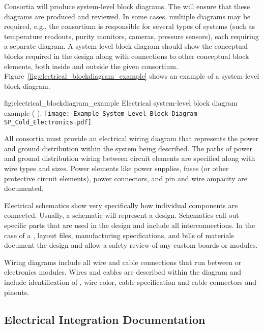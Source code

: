 Consortia will produce system-level block diagrams. The 
will ensure that these diagrams are produced and reviewed.  In
some cases, multiple %
diagrams may be required, e.g., the %
 consortium %
is responsible for several types of
systems (such as temperature readouts, purity monitors, cameras,
pressure sensors), each requiring a separate %
diagram. A system-level block diagram should show the conceptual
blocks required in the design along with connections to other
conceptual block elements, both inside and outside the given consortium.
Figure~\ref{fig:electrical_blockdiagram_example} shows an example of a
system-level block diagram.
\begin{dunefigure}{fig:electrical_blockdiagram_example}
  {Electrical system-level block diagram example ( ).}
 \texttt{[image: Example\_System\_Level\_Block-Diagram-SP\_Cold\_Electronics.pdf]}
\end{dunefigure}


All consortia must provide an electrical wiring diagram that 
represents the power and ground distribution within the system being
described.  The paths of power and ground distribution wiring between
circuit elements are specified along with wire types and sizes.  Power
elements like power supplies, fuses (or other protective circuit
elements), power connectors, and pin and wire ampacity are documented.


Electrical schematics show very specifically how individual
components are connected.  Usually, a schematic will represent a
 design.  Schematics call out specific
parts that are used in the design and include all interconnections.
In the case of a , layout files, manufacturing
specifications, and bills of materials document
the design and allow a safety review of any custom boards or
modules.


Wiring diagrams include all wire and cable connections that run
between  or electronics modules.  Wires and
cables are described within the diagram and include identification of
, wire color, cable specification and
cable connectors and pinouts.





\subsection{Electrical Integration Documentation}
\label{sec:fdsp-coord-integ-electrical}

